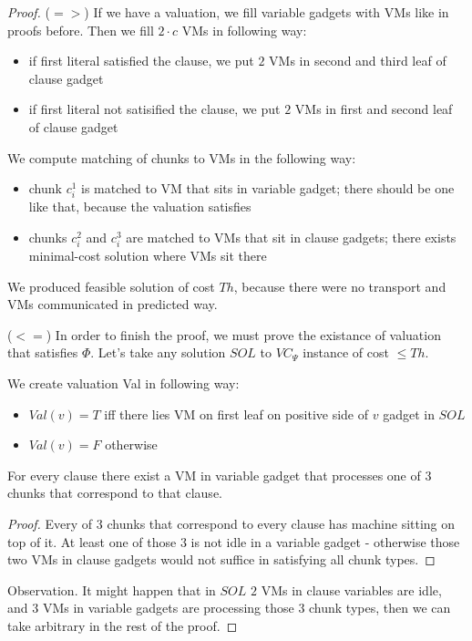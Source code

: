 \begin{proof} 
($=>$) If we have a valuation, we fill variable gadgets with VMs like in
proofs before. Then we fill $2 \cdot c$ VMs in following way:

\begin{itemize}
\item if first literal satisfied the clause, we put $2$ VMs in second and
third leaf of clause gadget
\item if first literal not satisified the clause, we put $2$ VMs in first
and second leaf of clause gadget
\end{itemize}

We compute matching of chunks to VMs in the following way:
\begin{itemize}
\item chunk $c_i^1$ is matched to VM that sits in variable gadget; there
should be one like that, because the valuation satisfies
\item chunks $c_i^2$ and $c_i^3$ are matched to VMs that sit in clause
gadgets; there exists minimal-cost solution where VMs sit there
\end{itemize}

We produced feasible solution of cost $Th$, because there were no
transport and VMs communicated in predicted way.

($<=$) In order to finish the proof, we must prove the existance of
valuation that satisfies $\Phi$. 
Let's take any solution $SOL$ to $VC_{\Psi}$ instance of cost $\leq Th$.

We create valuation Val in following way:
\begin{itemize}
\item $Val(v) = T$ iff there lies VM on first leaf on positive side of $v$ gadget in $SOL$
\item $Val(v) = F$ otherwise
\end{itemize}

\begin{lemma}For every clause there exist a VM in variable gadget that processes one of
  3 chunks that correspond to that clause.
\end{lemma}
\begin{proof}
 Every of $3$ chunks that correspond to every clause has machine sitting
on top of it. At least one of those $3$ is not idle in a variable gadget
- otherwise those two VMs in clause gadgets would not suffice in
satisfying all chunk types.\end{proof}

Observation. It might happen that in $SOL$ $2$ VMs in
clause variables are idle, and $3$ VMs in variable gadgets are
processing those $3$ chunk types, then we can take arbitrary in the rest
of the proof.



\end{proof}
